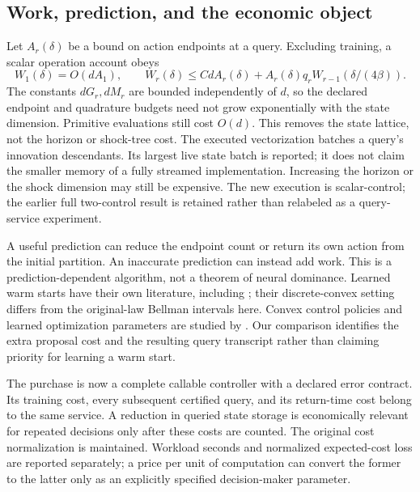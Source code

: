 \subsection{Work, prediction, and the economic object}
Let $A_r(\delta)$ be a bound on action endpoints at a query. Excluding training, a scalar operation account obeys
\[
 W_1(\delta)=O(dA_1),\qquad
 W_r(\delta)\le C d A_r(\delta)+
 A_r(\delta)q_r W_{r-1}(\delta/(4\beta)).
\]
The constants $dG_r,dM_r$ are bounded independently of $d$, so the declared endpoint and quadrature budgets need not grow exponentially with the state dimension. Primitive evaluations still cost $O(d)$. This removes the state lattice, not the horizon or shock-tree cost. The executed vectorization batches a query's innovation descendants. Its largest live state batch is reported; it does not claim the smaller memory of a fully streamed implementation. Increasing the horizon or the shock dimension may still be expensive. The new execution is scalar-control; the earlier full two-control result is retained rather than relabeled as a query-service experiment.

A useful prediction can reduce the endpoint count or return its own action from the initial partition. An inaccurate prediction can instead add work. This is a prediction-dependent algorithm, not a theorem of neural dominance. Learned warm starts have their own literature, including \citet{sakaue2023warm}; their discrete-convex setting differs from the original-law Bellman intervals here. Convex control policies and learned optimization parameters are studied by \citet{agrawal2020control}. Our comparison identifies the extra proposal cost and the resulting query transcript rather than claiming priority for learning a warm start.

The purchase is now a complete callable controller with a declared error contract. Its training cost, every subsequent certified query, and its return-time cost belong to the same service. A reduction in queried state storage is economically relevant for repeated decisions only after these costs are counted. The original cost normalization is maintained. Workload seconds and normalized expected-cost loss are reported separately; a price per unit of computation can convert the former to the latter only as an explicitly specified decision-maker parameter.
